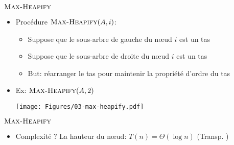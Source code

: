 \begin{frame}{$\textnormal{\scshape Max-Heapify}$}

\begin{itemize}
\item Procédure $\textnormal{\scshape Max-Heapify}(A,i)$:
\begin{itemize}
\item Suppose que le sous-arbre de gauche du n\oe ud $i$ est un tas
\item Suppose que le sous-arbre de droite du n\oe ud $i$ est un tas
\item But: réarranger le tas pour maintenir la propriété d'ordre du tas
\end{itemize}
\item Ex: $\textnormal{\scshape Max-Heapify}(A,2)$
\centerline{\texttt{[image: Figures/03-max-heapify.pdf]}}
\end{itemize}

\end{frame}

\begin{frame}{$\textnormal{\scshape Max-Heapify}$}

\begin{center}
\begin{small}
\end{small}
\end{center}

\bigskip

\begin{itemize}
\item Complexité ? La hauteur du n\oe ud: $T(n)=\Theta(\log n)$ (Transp. \pageref{03:hauteurtas})
\end{itemize}


\end{frame}

